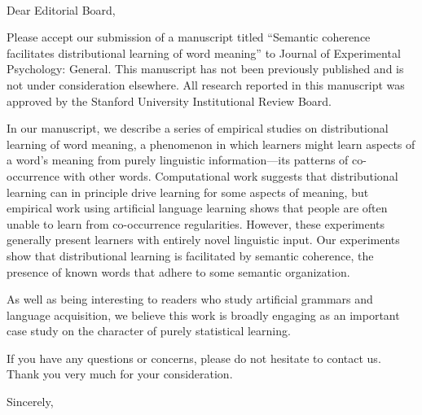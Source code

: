 \documentclass{letter}
\begin{document}
\address{450 Serra Mall \\ Building 420 (Jordan Hall) \\ Stanford, CA~~94305}
\signature{Long Ouyang, Lera Boroditsky,\\and Michael C. Frank}

\pagestyle{empty}
\begin{letter}{~~~}
\opening{Dear Editorial Board,}

Please accept our submission of a manuscript titled ``Semantic coherence facilitates distributional learning of word meaning'' to Journal of Experimental Psychology: General. This manuscript has not been previously published and is not under consideration elsewhere. All research reported in this manuscript was approved by the Stanford University Institutional Review Board.

In our manuscript, we describe a series of empirical studies on distributional learning of word meaning, a phenomenon in which learners might learn aspects of a word's meaning from purely linguistic information---its patterns of co-occurrence with other words. Computational work suggests that distributional learning can in principle drive learning for some aspects of meaning, but empirical work using artificial language learning shows that people are often unable to learn from co-occurrence regularities. However, these experiments generally present learners with entirely novel linguistic input. Our experiments show that distributional learning is facilitated by semantic coherence, the presence of known words that adhere to some semantic organization.

As well as being interesting to readers who study artificial grammars and language acquisition, we believe this work is broadly engaging as an important case study on the character of purely statistical learning.

If you have any questions or concerns, please do not hesitate to contact us. Thank you very much for your consideration.

\vspace{3\parskip}
\closing{Sincerely,}

\end{letter}
\end{document}
